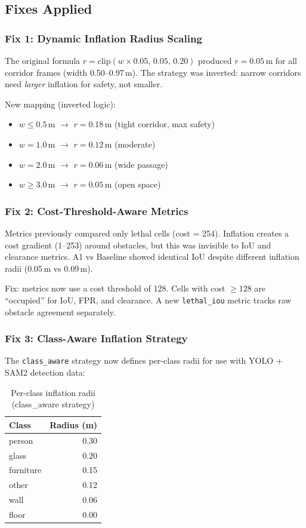 \documentclass[11pt,a4paper]{article}
\begin{document}
\subsection{Fixes Applied}
\label{sec:fixes}

\subsubsection{Fix 1: Dynamic Inflation Radius Scaling}

The original formula $r = \text{clip}(w \times 0.05,\, 0.05,\, 0.20)$ produced
$r = 0.05$\,m for all corridor frames (width 0.50--0.97\,m). The strategy was
inverted: narrow corridors need \emph{larger} inflation for safety, not smaller.

New mapping (inverted logic):
\begin{itemize}[nosep]
  \item $w \leq 0.5$\,m $\to$ $r = 0.18$\,m (tight corridor, max safety)
  \item $w = 1.0$\,m $\to$ $r = 0.12$\,m (moderate)
  \item $w = 2.0$\,m $\to$ $r = 0.06$\,m (wide passage)
  \item $w \geq 3.0$\,m $\to$ $r = 0.05$\,m (open space)
\end{itemize}

\subsubsection{Fix 2: Cost-Threshold-Aware Metrics}

Metrics previously compared only lethal cells (cost = 254). Inflation
creates a cost gradient (1--253) around obstacles, but this was invisible
to IoU and clearance metrics. A1 vs Baseline showed identical IoU despite
different inflation radii (0.05\,m vs 0.09\,m).

Fix: metrics now use a cost threshold of 128. Cells with cost $\geq 128$
are ``occupied'' for IoU, FPR, and clearance. A new \texttt{lethal\_iou}
metric tracks raw obstacle agreement separately.

\subsubsection{Fix 3: Class-Aware Inflation Strategy}

The \texttt{class\_aware} strategy now defines per-class radii for use
with YOLO + SAM2 detection data:

\begin{table}[h]
\centering
\caption{Per-class inflation radii (class\_aware strategy)}
\label{tab:class-radii}
\begin{tabular}{lr}
\toprule
\textbf{Class} & \textbf{Radius (m)} \\
\midrule
person     & 0.30 \\
glass      & 0.20 \\
furniture  & 0.15 \\
other      & 0.12 \\
wall       & 0.06 \\
floor      & 0.00 \\
\bottomrule
\end{tabular}
\end{table}
\end{document}

